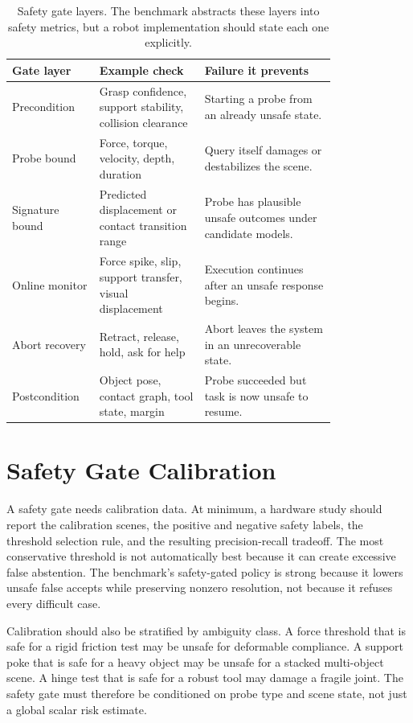 \documentclass{article}
\begin{document}
\begin{table}[p]
\centering
\small
\begin{tabular}{p{0.17\linewidth}p{0.28\linewidth}p{0.35\linewidth}}
\toprule
Gate layer & Example check & Failure it prevents \\
\midrule
Precondition & Grasp confidence, support stability, collision clearance & Starting a probe from an already unsafe state. \\
Probe bound & Force, torque, velocity, depth, duration & Query itself damages or destabilizes the scene. \\
Signature bound & Predicted displacement or contact transition range & Probe has plausible unsafe outcomes under candidate models. \\
Online monitor & Force spike, slip, support transfer, visual displacement & Execution continues after an unsafe response begins. \\
Abort recovery & Retract, release, hold, ask for help & Abort leaves the system in an unrecoverable state. \\
Postcondition & Object pose, contact graph, tool state, margin & Probe succeeded but task is now unsafe to resume. \\
\bottomrule
\end{tabular}
\caption{Safety gate layers. The benchmark abstracts these layers into safety metrics, but a robot implementation should state each one explicitly.}
\label{tab:safety_gate_layers}
\end{table}

\section{Safety Gate Calibration}

A safety gate needs calibration data. At minimum, a hardware study should report the calibration scenes, the positive and negative safety labels, the threshold selection rule, and the resulting precision-recall tradeoff. The most conservative threshold is not automatically best because it can create excessive false abstention. The benchmark's safety-gated policy is strong because it lowers unsafe false accepts while preserving nonzero resolution, not because it refuses every difficult case.

Calibration should also be stratified by ambiguity class. A force threshold that is safe for a rigid friction test may be unsafe for deformable compliance. A support poke that is safe for a heavy object may be unsafe for a stacked multi-object scene. A hinge test that is safe for a robust tool may damage a fragile joint. The safety gate must therefore be conditioned on probe type and scene state, not just a global scalar risk estimate.
\end{document}
